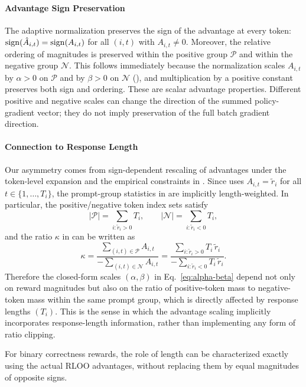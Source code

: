 \paragraph{Advantage Sign Preservation}
\label{par:adv-sign-preservation}
The adaptive normalization preserves the sign of the advantage at every token: $\operatorname{sign}(\hat{A}_{i,t}) = \operatorname{sign}(A_{i,t})$ for all $(i,t)$
with $A_{i,t} \neq 0$. Moreover, the relative ordering of magnitudes is preserved within the positive group $\mathcal{P}$ and within the
negative group $\mathcal{N}$. This follows immediately because the normalization scales $A_{i,t}$ by $\alpha>0$ on $\mathcal{P}$ and by
$\beta>0$ on $\mathcal{N}$ (), and multiplication by a positive constant preserves both sign and ordering.
These are scalar advantage properties. Different positive and negative scales can change the direction of the summed policy-gradient
vector; they do not imply preservation of the full batch gradient direction.

\paragraph{Connection to Response Length}
Our asymmetry comes from sign-dependent rescaling of advantages under the token-level expansion and the empirical constraints in
.
Since  uses $A_{i,t}=\tilde r_i$ for all $t\in\{1,\ldots,T_i\}$, the prompt-group statistics in
 are implicitly length-weighted. In particular, the positive/negative token index sets satisfy
\[
|\mathcal P| = \sum_{i:\tilde r_i>0} T_i,
\qquad
|\mathcal N| = \sum_{i:\tilde r_i<0} T_i,
\]
and the ratio $\kappa$ in  can be written as
\[
\kappa
=
\frac{\sum_{(i,t)\in\mathcal P} A_{i,t}}{-\sum_{(i,t)\in\mathcal N} A_{i,t}}
=
\frac{\sum_{i:\tilde r_i>0} T_i\,\tilde r_i}{-\sum_{i:\tilde r_i<0} T_i\,\tilde r_i}.
\]
Therefore the closed-form scales $(\alpha,\beta)$ in Eq.~\eqref{eq:alpha-beta} depend not only on reward magnitudes but also on the ratio of
positive-token mass to negative-token mass within the same prompt group, which is directly affected by response lengths $(T_i)$.
This is the sense in which the advantage scaling implicitly incorporates response-length information, rather than implementing any form of
ratio clipping.

For binary correctness rewards, the role of length can be characterized
exactly using the actual RLOO advantages, without replacing them by equal
magnitudes of opposite signs.

